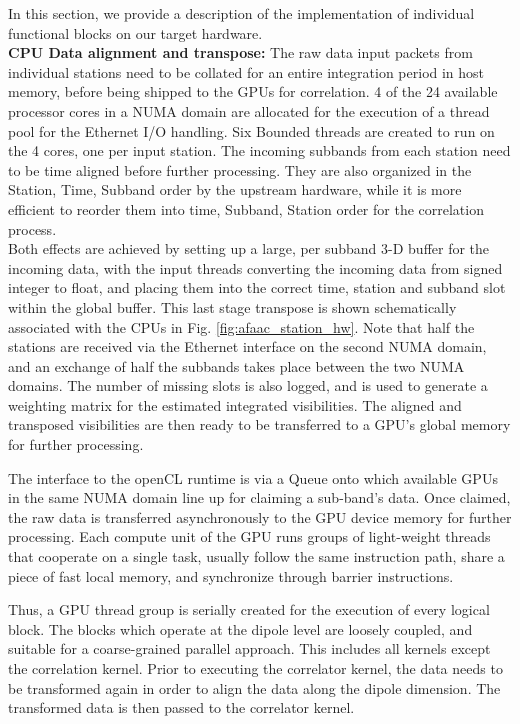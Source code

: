 \documentclass{ws-jai}
\begin{document}
In this  section, we provide a  description of the implementation  of individual
functional blocks on our target hardware.\\
\noindent \textbf {CPU Data alignment and transpose:} The raw data input packets
from individual stations need to be collated for an entire integration period in
host memory,  before being  shipped to the  GPUs for correlation.   4 of  the 24
available processor cores in a NUMA domain  are allocated for the execution of a
thread pool  for the Ethernet I/O  handling. Six Bounded threads  are created to
run on  the 4  cores, one per  input station.  The  incoming subbands  from each
station  need to  be  time aligned  before further  processing.   They are  also
organized in the {Station, Time, Subband}  order by the upstream hardware, while
it is more efficient to reorder them into {time, Subband, Station} order for the
correlation process.\\  Both effects  are achieved  by setting  up a  large, per
subband 3-D buffer for the incoming  data, with the input threads converting the
incoming data  from signed integer to  float, and placing them  into the correct
time,  station and  subband  slot within  the global  buffer.   This last  stage
transpose    is   shown    schematically   associated    with   the    CPUs   in
Fig. \ref{fig:afaac_station_hw}.  Note  that half the stations  are received via
the Ethernet interface  on the second NUMA  domain, and an exchange  of half the
subbands takes place  between the two NUMA domains. The  number of missing slots
is also  logged, and is  used to generate a  weighting matrix for  the estimated
integrated visibilities. The aligned and  transposed visibilities are then ready
to be transferred to a GPU's global memory for further processing.

The interface to the openCL runtime is  via a Queue onto which available GPUs in
the same NUMA domain  line up for claiming a sub-band's  data.  Once claimed, the
raw data  is transferred  asynchronously to  the GPU  device memory  for further
processing. Each  compute unit of  the GPU  runs groups of  light-weight threads
that cooperate on a single task, usually follow the same instruction path, share
a piece of fast local memory, and synchronize through barrier instructions.

Thus, a GPU thread group is serially  created for the execution of every logical
block.  The  blocks which operate at  the dipole level are  loosely coupled, and
suitable  for a  coarse-grained parallel  approach.  This  includes all  kernels
except the correlation kernel. Prior to executing the correlator kernel, the data
needs  to be  transformed again   in order  to  align the  data along the dipole
dimension. The transformed data is then passed to the correlator kernel.
\end{document}
